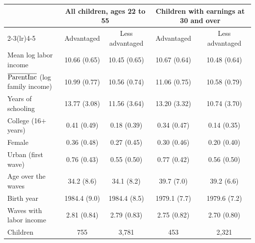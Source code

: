 \setlength{\tabcolsep}{5pt}
\begin{tabular}{@{}lcccc@{}}
\toprule
& \multicolumn{2}{c}{All children, ages 22 to 55} & \multicolumn{2}{c}{Children with earnings at 30 and over} \\
\cmidrule(lr){2-3}\cmidrule(lr){4-5}
& Advantaged & Less advantaged & Advantaged & Less advantaged \\
\midrule
Mean log labor income & 10.66 (0.65) & 10.45 (0.65) & 10.67 (0.64) & 10.48 (0.64) \\
$\overline{\mathrm{ParentInc}}$ (log family income) & 10.99 (0.77) & 10.56 (0.74) & 11.06 (0.75) & 10.58 (0.79) \\
Years of schooling & 13.77 (3.08) & 11.56 (3.64) & 13.20 (3.32) & 10.74 (3.70) \\
College (16$+$ years) & 0.41 (0.49) & 0.18 (0.39) & 0.34 (0.47) & 0.14 (0.35) \\
Female & 0.36 (0.48) & 0.27 (0.45) & 0.30 (0.46) & 0.20 (0.40) \\
Urban (first wave) & 0.76 (0.43) & 0.55 (0.50) & 0.77 (0.42) & 0.56 (0.50) \\
Age over the waves & 34.2 (8.6) & 34.1 (8.2) & 39.7 (7.0) & 39.2 (6.6) \\
Birth year & 1984.4 (9.0) & 1984.4 (8.5) & 1979.1 (7.7) & 1979.6 (7.2) \\
Waves with labor income & 2.81 (0.84) & 2.79 (0.83) & 2.75 (0.82) & 2.70 (0.80) \\
\addlinespace
Children & 755 & 3,781 & 453 & 2,321 \\
\bottomrule
\end{tabular}
